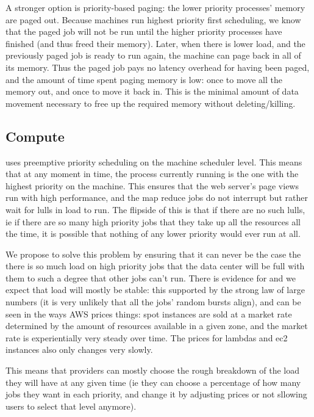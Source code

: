 A stronger option is priority-based paging: the lower priority processes' memory
are paged out. Because machines run highest priority first scheduling, we know
that the paged job will not be run until the higher priority processes have
finished (and thus freed their memory). Later, when there is lower load, and the previously
paged job is ready to run again, the machine can page back in all of its memory.
Thus the paged job pays no latency overhead for having been paged, and the
amount of time spent paging memory is low: once to move all the memory out, and
once to move it back in. This is the minimal amount of data movement necessary
to free up the required memory without deleting/killing.


\subsection{Compute}

\sys{} uses preemptive priority scheduling on the machine scheduler level. This
means that at any moment in time, the process currently running is the one with
the highest priority on the machine. This ensures that the web server's page
views run with high performance, and the map reduce jobs do not interrupt but
rather wait for lulls in load to run. The flipside of this is that if there are
no such lulls, ie if there are so many high priority jobs that they take up all
the resources all the time, it is possible that nothing of any lower priority
would ever run at all.

We propose to solve this problem by ensuring that it can never be the case the
there is so much load on high priority jobs that the data center will be full
with them to such a degree that other jobs can't run. There is evidence for and
we expect that load will mostly be stable: this supported by the strong law of
large numbers (it is very unlikely that all the jobs' random bursts align), and
can be seen in the ways AWS prices things: spot instances are sold at a market
rate determined by the amount of resources available in a given zone\cite{TODO},
and the market rate is experientially very steady over time\cite{TODO}. The
prices for lambdas and ec2 instances also only changes very
slowly\cite{TODO}.

This means that providers can mostly choose the rough breakdown of the load they
will have at any given time (ie they can choose a percentage of how many jobs
they want in each priority, and change it by adjusting prices or not sllowing
users to select that level anymore). 



